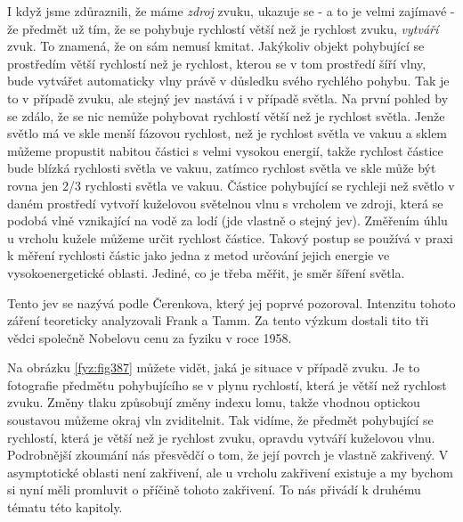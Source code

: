   I když jsme zdůraznili, že máme \emph{zdroj} zvuku, ukazuje se - a to je velmi zajímavé - že 
  předmět už tím, že se pohybuje rychlostí větší než je rychlost zvuku, \emph{vytváří} zvuk. To 
  znamená, že on sám nemusí kmitat. Jakýkoliv objekt pohybující se prostředím větší rychlostí než 
  je rychlost, kterou se v tom prostředí šíří vlny, bude vytvářet automaticky vlny právě v důsledku 
  svého rychlého pohybu. Tak je to v případě zvuku, ale stejný jev nastává i v případě světla. Na 
  první pohled by se zdálo, že se nic nemůže pohybovat rychlostí větší než je rychlost světla. 
  Jenže světlo má ve skle menší fázovou rychlost, než je rychlost světla ve vakuu a sklem můžeme 
  propustit nabitou částici s velmi vysokou energií, takže rychlost částice bude blízká rychlosti 
  světla ve vakuu, zatímco rychlost světla ve skle může být rovna jen 2/3 rychlosti světla ve 
  vakuu. Částice pohybující se rychleji než světlo v daném prostředí vytvoří kuželovou světelnou 
  vlnu s vrcholem ve zdroji, která se podobá vlně vznikající na vodě za lodí (jde vlastně o stejný 
  jev). Změřením úhlu u vrcholu kužele můžeme určit rychlost částice. Takový postup se používá v 
  praxi k měření rychlosti částic jako jedna z metod určování jejich energie ve vysokoenergetické 
  oblasti. Jediné, co je třeba měřit, je směr šíření světla. 
  
  Tento jev se nazývá podle Čerenkova, který jej poprvé pozoroval. Intenzitu tohoto záření 
  teoreticky analyzovali Frank a Tamm. Za tento výzkum dostali tito tři vědci společně Nobelovu 
  cenu za fyziku v roce 1958.
  
  Na obrázku \ref{fyz:fig387} můžete vidět, jaká je situace v případě zvuku. Je to fotografie 
  předmětu pohybujícího se v plynu rychlostí, která je větší než rychlost zvuku. Změny tlaku 
  způsobují změny indexu lomu, takže vhodnou optickou soustavou můžeme okraj vln zviditelnit. Tak 
  vidíme, že předmět pohybující se rychlostí, která je větší než je rychlost zvuku, opravdu vytváří 
  kuželovou vlnu. Podrobnější zkoumání nás přesvědčí o tom, že její povrch je vlastně zakřivený. V 
  asymptotické oblasti není zakřivení, ale u vrcholu zakřivení existuje a my bychom si nyní měli 
  promluvit o příčině tohoto zakřivení. To nás přivádí k druhému tématu této kapitoly.
  

